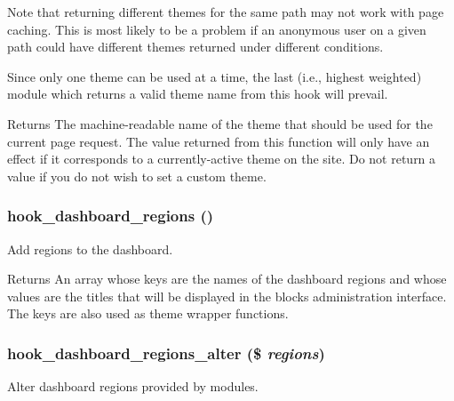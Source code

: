 Note that returning different themes for the same path may not work with page caching. This is most likely to be a problem if an anonymous user on a given path could have different themes returned under different conditions.

Since only one theme can be used at a time, the last (i.e., highest weighted) module which returns a valid theme name from this hook will prevail.

\begin{DoxyReturn}{Returns}
The machine-\/readable name of the theme that should be used for the current page request. The value returned from this function will only have an effect if it corresponds to a currently-\/active theme on the site. Do not return a value if you do not wish to set a custom theme. 
\end{DoxyReturn}
\hypertarget{group__hooks_ga533120daedea0c0bfd332400aab41ae2}{
\subsubsection[{hook\_\-dashboard\_\-regions}]{\setlength{\rightskip}{0pt plus 5cm}hook\_\-dashboard\_\-regions ()}}
\label{group__hooks_ga533120daedea0c0bfd332400aab41ae2}
Add regions to the dashboard.

\begin{DoxyReturn}{Returns}
An array whose keys are the names of the dashboard regions and whose values are the titles that will be displayed in the blocks administration interface. The keys are also used as theme wrapper functions. 
\end{DoxyReturn}
\hypertarget{group__hooks_gaf5148b413ca475e8d5246dad5357b918}{
\subsubsection[{hook\_\-dashboard\_\-regions\_\-alter}]{\setlength{\rightskip}{0pt plus 5cm}hook\_\-dashboard\_\-regions\_\-alter (\$ {\em regions})}}
\label{group__hooks_gaf5148b413ca475e8d5246dad5357b918}
Alter dashboard regions provided by modules.


